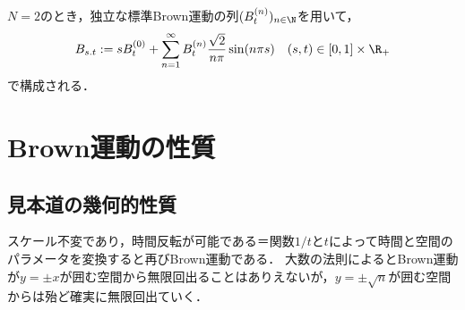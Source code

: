 \documentclass[uplatex,dvipdfmx]{jsreport}
\begin{document}
\begin{proposition}[Brown葉の構成]
    $N=2$のとき，独立な標準Brown運動の列$(B_t^{(n)})_{n\in\N}$を用いて，
    \[B_{s.t}:=sB_t^{(0)}+\sum_{n=1}^\infty B_t^{(n)}\frac{\sqrt{2}}{n\pi}\sin(n\pi s)\quad(s,t)\in[0,1]\times\R_+\]
    で構成される．
\end{proposition}

\section{Brown運動の性質}

\subsection{見本道の幾何的性質}

\begin{tcolorbox}[colframe=ForestGreen, colback=ForestGreen!10!white,breakable,colbacktitle=ForestGreen!40!white,coltitle=black,fonttitle=\bfseries\sffamily,
title=フラクタル曲線の典型例である]
    スケール不変であり，時間反転が可能である＝関数$1/t$と$t$によって時間と空間のパラメータを変換すると再びBrown運動である．
    大数の法則によるとBrown運動が$y=\pm x$が囲む空間から無限回出ることはありえないが，$y=\pm\sqrt{n}$が囲む空間からは殆ど確実に無限回出ていく．
\end{tcolorbox}
\end{document}
